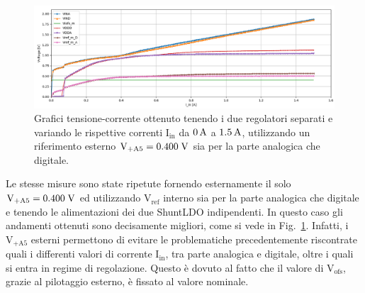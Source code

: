 \begin{figure}
\centering
\includegraphics[width=\textwidth]{Immagini/IUEViofs2}
\caption{Grafici tensione-corrente ottenuto tenendo i due regolatori separati e variando le rispettive correnti $\mathrm{I_{in}}$ da $0\rm \, A$ a $1.5\rm \, A$, utilizzando un riferimento esterno $\mathrm{V_{+A5}}=0.400\rm \; V$ sia per la parte analogica che digitale.}
\label{IUEViofs}
\end{figure}
 Le stesse misure sono state ripetute fornendo esternamente il solo $\mathrm{V_{+A5}}=0.400 \rm \; V$ ed utilizzando $\mathrm{V_{ref}}$ interno sia per la parte analogica che digitale e tenendo le alimentazioni dei due ShuntLDO indipendenti. In questo caso gli andamenti ottenuti sono decisamente migliori, come si vede in Fig.~\ref{IUEViofs}. 
Infatti, i $\mathrm{V_{+A5}}$ esterni permettono di evitare le problematiche precedentemente riscontrate quali i differenti valori di corrente $\mathrm{I_{in}}$, tra parte analogica e digitale, oltre i quali si entra in regime di regolazione. Questo è dovuto al fatto che il valore di $\mathrm{V_{ofs}}$, grazie al pilotaggio esterno, \`e fissato al valore nominale. %
% 
%
%



